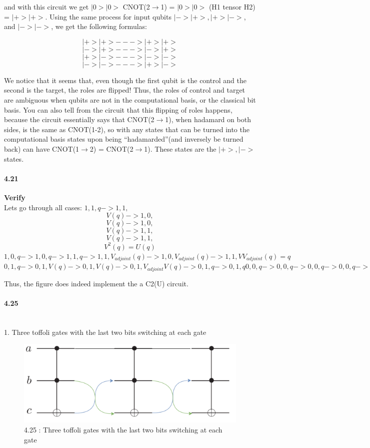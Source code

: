 and with this circuit we get $|0>|0>$ CNOT(2$\rightarrow$1) = $|0>|0>$ (H1 tensor H2) = $|+>|+>$. Using the same process for input qubits $|->|+>, |+>|->$, and $|->|->$, we get the following formulas:


$$|+>|+> ---> |+>|+>$$
$$|->|+> ---> |->|+>$$
 $$|+>|-> ---> |->|->$$
$$|->|-> ---> |+>|->$$

       
        
We notice that it seems that, even though the first qubit is the control and the second is the target, the roles are flipped! Thus, the roles of control and target are ambiguous when qubits are not in the computational basis, or the classical bit basis. You can also tell from the circuit that this flipping of roles happens, because the circuit essentially says that CNOT(2$\rightarrow$1), when hadamard on both sides, is the same as CNOT(1-2), so with any states that can be turned into the computational basis states upon being “hadamarded”(and inversely be turned back) can have CNOT(1$\rightarrow$2) = CNOT(2$\rightarrow$1). These states are the $|+>, |->$ states.


\paragraph{4.21} \textbf{Verify}
\\

Lets go through all cases:
$1, 1, q -> 1, 1,$
\\
$$ V(q) -> 1, 0,$$
$$ V(q) -> 1, 0,$$
$$ V(q) -> 1, 1, $$
$$V(q) -> 1, 1, $$
$$V^2(q) = U(q)$$
$ 1, 0, q -> 1, 0, q -> 1, 1, q -> 1, 1, V_{adjoint}(q) -> 1, 0, V_{adjoint}(q) -> 1, 1, VV_{adjoint}(q) = q$
$0, 1, q -> 0, 1, V(q) -> 0, 1, V(q) -> 0, 1, V_{adjoint} V(q) -> 0, 1, q -> 0, 1, q
0, 0, q -> 0, 0, q -> 0, 0, q -> 0, 0, q -> 0, 0, q -> 0, 0, q$
 
Thus, the figure does indeed implement the a C2(U) circuit.

\paragraph{4.25} \textbf{}
\\

1. Three toffoli gates with the last two bits switching at each gate
\begin{figure}[h!]
    \centering
    \includegraphics[width = \linewidth]{Chapter 4/4.25.png}
    \caption{4.25 : Three toffoli gates with the last two bits switching at each gate}
    \label{fig:my_label}
\end{figure}

